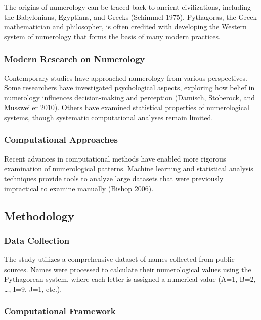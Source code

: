 \documentclass[
  11pt,
]{article}
\begin{document}
The origins of numerology can be traced back to ancient civilizations,
including the Babylonians, Egyptians, and Greeks (Schimmel 1975).
Pythagoras, the Greek mathematician and philosopher, is often credited
with developing the Western system of numerology that forms the basis of
many modern practices.

\subsubsection{Modern Research on
Numerology}\label{modern-research-on-numerology}

Contemporary studies have approached numerology from various
perspectives. Some researchers have investigated psychological aspects,
exploring how belief in numerology influences decision-making and
perception (Damisch, Stoberock, and Mussweiler 2010). Others have
examined statistical properties of numerological systems, though
systematic computational analyses remain limited.

\subsubsection{Computational Approaches}\label{computational-approaches}

Recent advances in computational methods have enabled more rigorous
examination of numerological patterns. Machine learning and statistical
analysis techniques provide tools to analyze large datasets that were
previously impractical to examine manually (Bishop 2006).

\subsection{Methodology}\label{methodology}

\subsubsection{Data Collection}\label{data-collection}

The study utilizes a comprehensive dataset of names collected from
public sources. Names were processed to calculate their numerological
values using the Pythagorean system, where each letter is assigned a
numerical value (A=1, B=2, \ldots, I=9, J=1, etc.).

\subsubsection{Computational Framework}\label{computational-framework}
\end{document}
